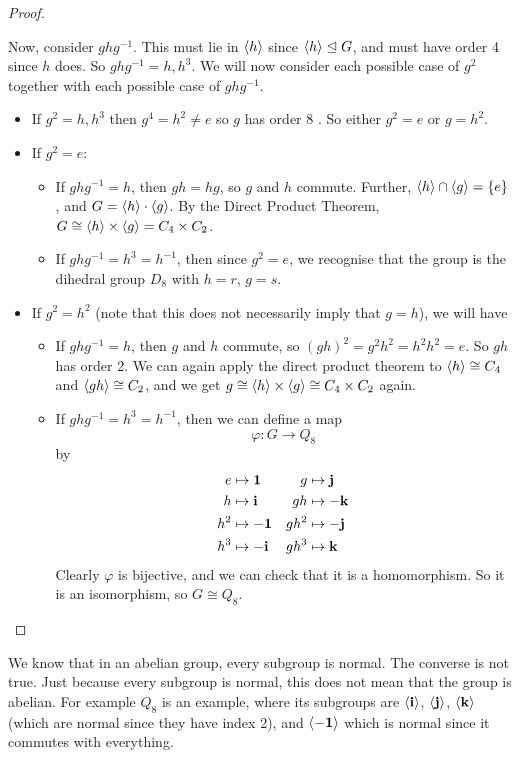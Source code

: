 \begin{proof}
\begin{itemize}
		      Now, consider $ghg^{-1}$. This must lie in $\langle h \rangle$ since $\langle h \rangle \trianglelefteq G$, and must have order 4 since $h$ does. So $ghg^{-1} = h, h^3$. We will now consider each possible case of $g^2$ together with each possible case of $ghg^{-1}$.
		      \begin{itemize}
			      \item If $g^2 = h, h^3$ then $g^4 = h^2 \neq e$ so $g$ has order 8 \contradiction. So either $g^2 = e$ or $g=h^2$.
			      \item If $g^2 = e$:
			            \begin{itemize}
				            \item If $ghg^{-1} = h$, then $gh = hg$, so $g$ and $h$ commute. Further, $\langle h \rangle \cap \langle g \rangle = \{ e \}$, and $G = \langle h \rangle \cdot \langle g \rangle$. By the Direct Product Theorem, $G \cong \langle h \rangle \times \langle g \rangle = C_4 \times C_2$.
				            \item If $ghg^{-1} = h^3 = h^{-1}$, then since $g^2 = e$, we recognise that the group is the dihedral group $D_8$ with $h=r$, $g=s$.
			            \end{itemize}
			      \item If $g^2 = h^2$ (note that this does not necessarily imply that $g=h$), we will have
			            \begin{itemize}
				            \item If $ghg^{-1} = h$, then $g$ and $h$ commute, so $(gh)^2 = g^2h^2 = h^2h^2 = e$. So $gh$ has order 2. We can again apply the direct product theorem to $\langle h \rangle \cong C_4$ and $\langle gh \rangle \cong C_2$, and we get $g \cong \langle h \rangle \times \langle g \rangle \cong C_4 \times C_2$ again.
				            \item If $ghg^{-1} = h^3 = h^{-1}$, then we can define a map
				                  \[ \varphi \colon G \to Q_8 \]
				                  by
				                  \begin{align*}
					                  e   & \mapsto \vb 1  & g    & \mapsto \vb j  \\
					                  h   & \mapsto \vb i  & gh   & \mapsto -\vb k \\
					                  h^2 & \mapsto -\vb 1 & gh^2 & \mapsto -\vb j \\
					                  h^3 & \mapsto -\vb i & gh^3 & \mapsto \vb k
				                  \end{align*}
				                  Clearly $\varphi$ is bijective, and we can check that it is a homomorphism. So it is an isomorphism, so $G \cong Q_8$.
			            \end{itemize}
		      \end{itemize}
	\end{itemize}
\end{proof}
\begin{remark}
	We know that in an abelian group, every subgroup is normal. The converse is not true. Just because every subgroup is normal, this does not mean that the group is abelian. For example $Q_8$ is an example, where its subgroups are $\langle \vb i \rangle$, $\langle \vb j \rangle$, $\langle \vb k \rangle$ (which are normal since they have index 2), and $\langle -\vb 1 \rangle$ which is normal since it commutes with everything.
\end{remark}
